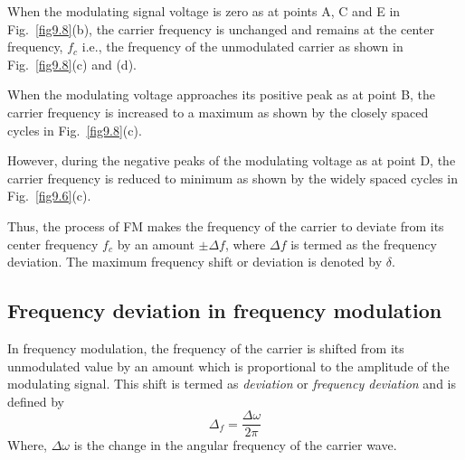 When the modulating signal voltage is zero as at points A, C and E in Fig.~\ref{fig9.8}(b), the carrier frequency is unchanged and remains at the center frequency, $f_{c}$ i.e., the frequency of the unmodulated carrier as shown in Fig.~\ref{fig9.8}(c) and (d).

When the modulating voltage approaches its positive peak as at point B, the carrier frequency is increased to a maximum as shown by the closely spaced cycles in Fig.~\ref{fig9.8}(c).

However, during the negative peaks of the modulating voltage as at point D, the carrier frequency is reduced to minimum as shown by the widely spaced cycles in Fig.~\ref{fig9.6}(c).

Thus, the process of FM makes the frequency of the carrier to deviate from its center frequency $f_{c}$ by an amount $\pm \Delta f$, where $\Delta f$ is termed as the frequency deviation. The maximum frequency shift or deviation is denoted by $\delta$.

\subsection{Frequency deviation in frequency modulation}\label{sec9.18.2}

In frequency modulation, the frequency of the carrier is shifted from its unmodulated value by an amount which is proportional to the amplitude of the modulating signal. This shift is termed as {\em deviation} or {\em frequency deviation} and is defined by
\begin{equation}
\Delta_{f}=\frac{\Delta \omega}{2\pi}\label{eq9.52}
\end{equation}
Where, $\Delta\omega$ is the change in the angular frequency of the carrier wave.

